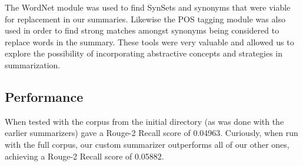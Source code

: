 \documentclass[11pt,letterpaper]{article}
\begin{document}
The WordNet module was used to find SynSets and synonyms that were viable for replacement in our summaries. Likewise the POS tagging module was also used in order to find strong matches amongst synonyms being considered to replace words in the summary. These tools were very valuable and allowed us to explore the possibility of incorporating abstractive concepts and strategies in summarization.

\subsection{Performance}
When tested with the corpus from the initial directory (as was done with the earlier summarizers) gave a Rouge-2 Recall score of 0.04963. Curiously, when run with the full corpus, our custom summarizer outperforms all of our other ones, achieving a Rouge-2 Recall score of 0.05882.
\end{document}
